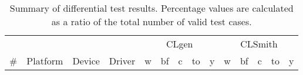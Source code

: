 \begin{table*}[t!]
  \scriptsize %
  \centering %
  \begin{tabular}{llll | rrrrr | rrrrr }
    \toprule
     & & & & \multicolumn{5}{|c|}{CLgen} & \multicolumn{5}{|c}{CLSmith} \\
    \# & Platform & Device & Driver & w & bf & c & to & y & w & bf & c & to & y \\
    \midrule

    \bottomrule
  \end{tabular}
  \caption{Summary of differential test results. Percentage values are calculated as a ratio of the total number of valid test cases. }
  \label{tab:results}
\end{table*}
